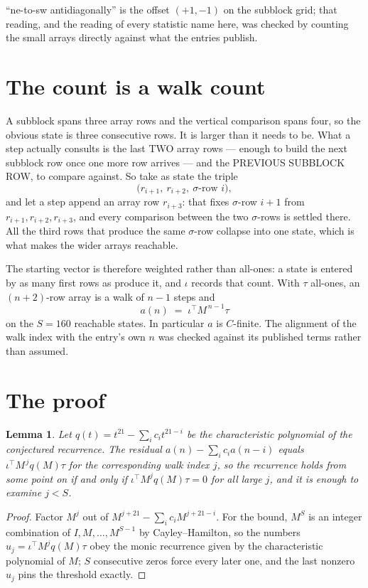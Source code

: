 \documentclass[11pt,a4paper]{article}
\theoremstyle{plain}
\newtheorem{lemma}[theorem]{Lemma}
\theoremstyle{definition}
\begin{document}
``ne-to-sw antidiagonally'' is the offset $(+1,-1)$ on the subblock grid; that reading, and
the reading of every statistic name here, was checked by counting the small arrays directly
against what the entries publish.

\section{The count is a walk count}

A subblock spans three array rows and the vertical comparison spans four, so the obvious state
is three consecutive rows. It is larger than it needs to be. What a step actually consults is
the last TWO array rows --- enough to build the next subblock row once one more row arrives ---
and the PREVIOUS SUBBLOCK ROW, to compare against. So take as state the triple
\[
\bigl(r_{i+1},\ r_{i+2},\ \sigma\text{-row }i\bigr),
\]
and let a step append an array row $r_{i+3}$: that fixes $\sigma$-row $i+1$ from
$r_{i+1},r_{i+2},r_{i+3}$, and every comparison between the two $\sigma$-rows is settled
there. All the third rows that produce the same $\sigma$-row collapse into one state, which is
what makes the wider arrays reachable.

The starting vector is therefore weighted rather than all-ones: a state is entered by as many
first rows as produce it, and $\iota$ records that count. With $\tau$ all-ones, an
$(n+2)$-row array is a walk of $n-1$ steps and
\[
a(n)\;=\;\iota^{\!\top}M^{\,n-1}\tau
\]
on the $S=160$ reachable states. In particular $a$ is $C$-finite. The alignment of the walk
index with the entry's own $n$ was checked against its published terms rather than assumed.

\section{The proof}

\begin{lemma}\label{lem:crit}
Let $q(t)=t^{21}-\sum_i c_it^{21-i}$ be the characteristic polynomial of the
conjectured recurrence. The residual $a(n)-\sum_ic_ia(n-i)$ equals
$\iota^{\!\top}M^{\,j}q(M)\tau$ for the corresponding walk index $j$, so the recurrence
holds from some point on if and only if $\iota^{\!\top}M^{j}q(M)\tau=0$ for all large $j$,
and it is enough to examine $j<S$.
\end{lemma}

\begin{proof}
Factor $M^{j}$ out of $M^{j+21}-\sum_ic_iM^{j+21-i}$. For the bound, $M^{S}$
is an integer combination of $I,M,\dots,M^{S-1}$ by Cayley--Hamilton, so the numbers
$u_j=\iota^{\!\top}M^{j}q(M)\tau$ obey the monic recurrence given by the characteristic
polynomial of $M$; $S$ consecutive zeros force every later one, and the last nonzero $u_j$
pins the threshold exactly.
\end{proof}
\end{document}
